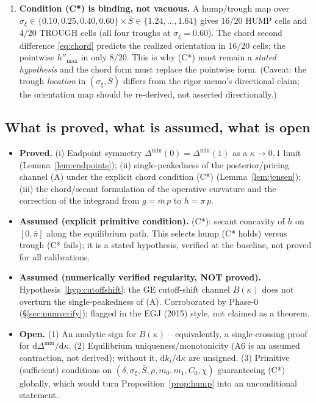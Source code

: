 \begin{enumerate}
\item \textbf{Condition (C*) is binding, not vacuous.} A hump/trough map over
$\sigma_\xi\in\{0.10,0.25,0.40,0.60\}\times \bar S\in\{1.24,\dots,1.64\}$ gives
$16/20$ HUMP cells and $4/20$ TROUGH cells (all four troughs at
$\sigma_\xi=0.60$). The chord second difference \eqref{eq:chord} predicts the
realized orientation in $16/20$ cells; the pointwise $h''_{\max}$ in only
$8/20$. This is why (C*) must remain a \emph{stated hypothesis} and the chord
form must replace the pointwise form. (Caveat: the trough \emph{location} in
$(\sigma_\xi,\bar S)$ differs from the rigor memo's directional claim; the
orientation map should be re-derived, not asserted directionally.)
\end{enumerate}

\subsection*{What is proved, what is assumed, what is open}

\begin{itemize}
\item \textbf{Proved.} (i) Endpoint symmetry $\Delta^{\min}(0)=\Delta^{\min}(1)$
as a $\kappa\to0,1$ limit (Lemma~\ref{lem:endpoints}); (ii) single-peakedness of
the posterior/pricing channel (A) under the explicit chord condition (C*)
(Lemma~\ref{lem:jensen}); (iii) the chord/secant formulation of the operative
curvature and the correction of the integrand from $g=\bar m\,p$ to
$h=\pi\,p$.

\item \textbf{Assumed (explicit primitive condition).} (C*): secant concavity of
$h$ on $[0,\bar\pi]$ along the equilibrium path. This selects hump (C* holds)
versus trough (C* fails); it is a stated hypothesis, verified at the baseline,
not proved for all calibrations.

\item \textbf{Assumed (numerically verified regularity, NOT proved).}
Hypothesis~\ref{hyp:cutoffshift}: the GE cutoff-shift channel $B(\kappa)$ does
not overturn the single-peakedness of (A). Corroborated by Phase-0
(\S\ref{sec:numverify}); flagged in the EGJ (2015) style, not claimed as a
theorem.

\item \textbf{Open.} (1) An analytic sign for $B(\kappa)$ -- equivalently, a
single-crossing proof for $\mathrm{d}\Delta^{\min}/\mathrm{d}\kappa$. (2) Equilibrium
uniqueness/monotonicity (A6 is an assumed contraction, not derived); without it,
$\mathrm{d} k_i/\mathrm{d}\kappa$ are unsigned. (3) Primitive (sufficient) conditions on
$(\delta,\sigma_\xi,\bar S,\rho,m_0,m_1,C_0,\chi)$ guaranteeing (C*) globally,
which would turn Proposition~\ref{prop:hump} into an unconditional statement.
\end{itemize}

